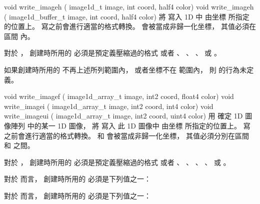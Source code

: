 void write_imageh (
	image1d_t image,
	int coord,
	half4 color)
void write_imageh (
	image1d_buffer_t image,
	int coord,
	half4 color)
\stopbuffer
{}
將  寫入 1D   中
由坐標  所指定的位置上。
寫之前會進行適當的格式轉換。
 會被當成非歸一化坐標，
其值必須在區間  內。

對於 ，
創建時所用的  必須是預定義壓縮過的格式
或者 、 、 、
  或 。

如果創建時所用的  不再上述所列範圍內，
或者坐標不在  範圍內，
則  的行為未定義。
\stopbuffer

void write_imagef (
	image1d_array_t image,
	int2 coord,
	float4 color)
void write_imagei (
	image1d_array_t image,
	int2 coord,
	int4 color)
void write_imageui (
	image1d_array_t image,
	int2 coord,
	uint4 color)
\stopbuffer
{}
用  確定 1D 圖像陣列  中的某一 1D 圖像，
將  寫入 此 1D 圖像中
由坐標  所指定的位置上。
寫之前會進行適當的格式轉換。
 和  會被當成非歸一化坐標，
其值必須分別在區間  和  之間。

對於 ，
創建時所用的  必須是預定義壓縮過的格式
或者 、 、 、
 、  或 。

對於  而言，
創建時所用的  必須是下列值之一：
\startigBase
\item {}
\item {}
\item {}
\stopigBase

對於  而言，
創建時所用的  必須是下列值之一：
\startigBase
\item {}
\item {}
\item {}
\stopigBase

